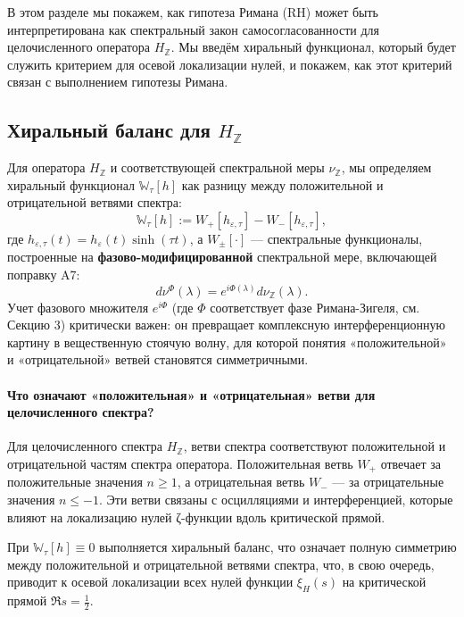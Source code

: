 \documentclass{article}
\numberwithin{equation}{section}
\theoremstyle{plain}
\theoremstyle{definition}
\theoremstyle{remark}
\def\cdot{·}\def\times{×}\def\pm{±}\def\mp{∓}\def\approx{≈}%
\begin{document}
\noindent
В этом разделе мы покажем, как гипотеза Римана (RH) может быть интерпретирована как спектральный закон самосогласованности для целочисленного оператора \( H_{\mathbb{Z}} \). Мы введём хиральный функционал, который будет служить критерием для осевой локализации нулей, и покажем, как этот критерий связан с выполнением гипотезы Римана.

\subsection{Хиральный баланс для \( H_{\mathbb{Z}} \)}
\label{subsec:chiral-balance}

\noindent
Для оператора \( H_{\mathbb{Z}} \) и соответствующей спектральной меры \( \nu_{\mathbb{Z}} \), мы определяем хиральный функционал \( \mathbb{W}_{\tau}[h] \) как разницу между положительной и отрицательной ветвями спектра:
\[
\mathbb{W}_{\tau}[h] := W_+[h_{\varepsilon,\tau}] - W_-[h_{\varepsilon,\tau}],
\]
где \( h_{\varepsilon,\tau}(t) = h_{\varepsilon}(t) \sinh(\tau t) \), а \( W_{\pm}[\cdot] \) — спектральные функционалы, построенные на \textbf{фазово-модифицированной} спектральной мере, включающей поправку A7:
\[
d\nu^\Phi(\lambda) = e^{i\Phi(\lambda)} d\nu_{\mathbb{Z}}(\lambda).
\]
Учет фазового множителя \( e^{i\Phi} \) (где \(\Phi\) соответствует фазе Римана-Зигеля, см. Секцию 3) критически важен: он превращает комплексную интерференционную картину в вещественную стоячую волну, для которой понятия «положительной» и «отрицательной» ветвей становятся симметричными.

\paragraph{Что означают «положительная» и «отрицательная» ветви для целочисленного спектра?}
\noindent
Для целочисленного спектра \( H_{\mathbb{Z}} \), ветви спектра соответствуют положительной и отрицательной частям спектра оператора. Положительная ветвь \( W_+ \) отвечает за положительные значения \( n \geq 1 \), а отрицательная ветвь \( W_- \) — за отрицательные значения \( n \leq -1 \). Эти ветви связаны с осцилляциями и интерференцией, которые влияют на локализацию нулей ζ-функции вдоль критической прямой.

При \( \mathbb{W}_{\tau}[h] \equiv 0 \) выполняется хиральный баланс, что означает полную симметрию между положительной и отрицательной ветвями спектра, что, в свою очередь, приводит к осевой локализации всех нулей функции \( \xi_H(s) \) на критической прямой \( \Re s = \tfrac{1}{2} \).
\end{document}
